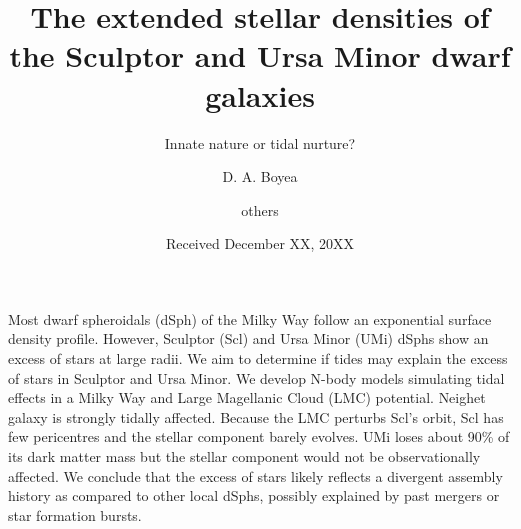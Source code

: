 \documentclass{aa}
\begin{document}
\title{The extended stellar densities of the Sculptor and Ursa Minor dwarf galaxies}

\subtitle{Innate nature or tidal nurture?}

%

   \author{D. A. Boyea
        \and others
        }


   \date{Received December XX, 20XX}

 
  \abstract
   {Most dwarf spheroidals (dSph) of the Milky Way follow an exponential surface density profile. However, Sculptor (Scl) and Ursa Minor (UMi) dSphs show an excess of stars at large radii.}
   {We aim to determine if tides may explain the excess of stars in Sculptor and Ursa Minor.} 
   {We develop N-body models simulating tidal effects in a Milky Way and Large Magellanic Cloud (LMC) potential. }
   {Neighet galaxy is strongly tidally affected. Because the LMC perturbs Scl's orbit, Scl has few pericentres and the stellar component barely evolves. UMi loses about 90\% of its dark matter mass but the stellar component would not be observationally affected. }
   {We conclude that the excess of stars likely reflects a divergent assembly history as compared to other local dSphs, possibly explained by past mergers or star formation bursts. }

\end{document}
